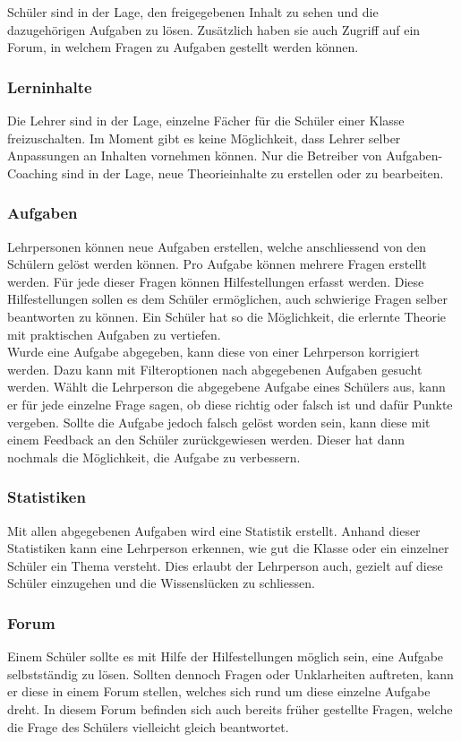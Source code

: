 Schüler sind in der Lage, den freigegebenen Inhalt zu sehen und die dazugehörigen Aufgaben zu lösen. Zusätzlich haben sie auch Zugriff auf ein Forum, in welchem Fragen zu Aufgaben gestellt werden können.

\subsubsection*{Lerninhalte}
Die Lehrer sind in der Lage, einzelne Fächer für die Schüler einer Klasse freizuschalten. Im Moment gibt es keine Möglichkeit, dass Lehrer selber Anpassungen an Inhalten vornehmen können. Nur die Betreiber von Aufgaben-Coaching sind in der Lage, neue Theorieinhalte zu erstellen oder zu bearbeiten.

\subsubsection*{Aufgaben}
Lehrpersonen können neue Aufgaben erstellen, welche anschliessend von den Schülern gelöst werden können. Pro Aufgabe können mehrere Fragen erstellt werden. Für jede dieser Fragen können Hilfestellungen erfasst werden. Diese Hilfestellungen sollen es dem Schüler ermöglichen, auch schwierige Fragen selber beantworten zu können. Ein Schüler hat so die Möglichkeit, die erlernte Theorie mit praktischen Aufgaben zu vertiefen. \\

Wurde eine Aufgabe abgegeben, kann diese von einer Lehrperson korrigiert werden. Dazu kann mit Filteroptionen nach abgegebenen Aufgaben gesucht werden. Wählt die Lehrperson die abgegebene Aufgabe eines Schülers aus, kann er für jede einzelne Frage sagen, ob diese richtig oder falsch ist und dafür Punkte vergeben. Sollte die Aufgabe jedoch falsch gelöst worden sein, kann diese mit einem Feedback an den Schüler zurückgewiesen werden. Dieser hat dann nochmals die Möglichkeit, die Aufgabe zu verbessern. 

\subsubsection*{Statistiken}
Mit allen abgegebenen Aufgaben wird eine Statistik erstellt. Anhand dieser Statistiken kann eine Lehrperson erkennen, wie gut die Klasse oder ein einzelner Schüler ein Thema versteht. Dies erlaubt der Lehrperson auch, gezielt auf diese Schüler einzugehen und die Wissenslücken zu schliessen.

\subsubsection*{Forum}
Einem Schüler sollte es mit Hilfe der Hilfestellungen möglich sein, eine Aufgabe selbstständig zu lösen. Sollten dennoch Fragen oder Unklarheiten auftreten, kann er diese in einem Forum stellen, welches sich rund um diese einzelne Aufgabe dreht. In diesem Forum befinden sich auch bereits früher gestellte Fragen, welche die Frage des Schülers vielleicht gleich beantwortet.

